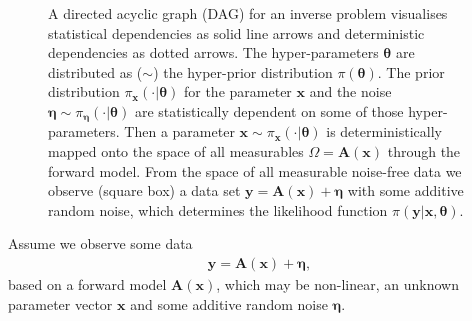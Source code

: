 \begin{figure}[ht!]
	\centering
	\caption[Hierarchical Bayesian Model]{A directed acyclic graph (DAG) for an inverse problem visualises statistical dependencies as solid line arrows and deterministic dependencies as dotted arrows.
		The hyper-parameters $\bm{\theta}$ are distributed as ($\sim$) the hyper-prior distribution $\pi(\bm{\theta})$.
		The prior distribution $ \pi_{\bm{x}}(\cdot|\bm{\theta})$ for the parameter $\bm{x}$ and the noise  $\bm{\eta} \sim \pi_{\bm{\eta}}(\cdot|\bm{\theta})$ are statistically dependent on some of those hyper-parameters.
		Then a parameter $\bm{x} \sim \pi_{\bm{x}}(\cdot|\bm{\theta})$ is deterministically mapped onto the space of all measurables $\Omega=\bm{A}(\bm{x})$ through the forward model.
		From the space of all measurable noise-free data we observe (square box) a data set $\bm{y} = \bm{A}(\bm{x}) + \bm{\eta}$ with some additive random noise, which determines the likelihood function $\pi(\bm{y}|\bm{x},\bm{\theta})$.}
	\label{fig:FirstDAG}
\end{figure}

Assume we observe some data
\begin{align}
	\bm{y} = \bm{A} (\bm{x}) + \bm{\eta},
	\label{eq:NonLinDat}
\end{align}
based on a forward model $\bm{A}(\bm{x})$, which may be non-linear, an unknown parameter vector $\bm{x}$ and some additive random noise $\bm{\eta}$.

